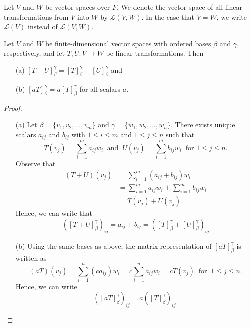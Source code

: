 \begin{definition}
    Let \( V  \) and \( W  \) be vector spaces over \( F  \). We denote the vector space of all linear transformations from \( V  \) into \( W   \) by \( \mathcal{L}(V,W)  \). In the case that \( V = W  \), we write \( \mathcal{L}(V)  \) instead of \( \mathcal{L}(V,W) \). 
\end{definition}

\begin{theorem}
   Let \( V  \) and \( W \) be finite-dimensional vector spaces with ordered bases \( \beta  \) and \( \gamma \), respectively, and let \( T,U : V \to W  \) be linear transformations. Then 
   \begin{enumerate}
       \item[(a)] \( [T+U]_{\beta}^{\gamma}  = [T]_{\beta}^{\gamma} + [U]_{\beta}^{\gamma}  \) and
        \item[(b)]\( [aT]_{\beta}^{\gamma}  = a [T]_{\beta}^{\gamma}  \) for all scalars \( a  \).
   \end{enumerate}
\end{theorem}
\begin{proof}
    \begin{enumerate}
        \item[(a)] 
    Let \( \beta = \{ {v}_{1}, {v}_{2}, \dots, {v}_{m} \}  \) and \( \gamma = \{ {w}_{1}, {w}_{2}, \dots, {w}_{n} \}  \). There exists unique scalars \( {a}_{ij}  \) and \( {b}_{ij}  \) with \( 1 \leq i \leq m  \) and \( 1 \leq j \leq n  \) such that
    \[  T({v}_{j}) = \sum_{ i=1 }^{ m } {a}_{ij} {w}_{i} \ \text{ and } \ U({v}_{j}) = \sum_{ i=1 }^{ m } {b}_{ij} {w}_{i} \ \text{ for } 1 \leq j \leq n.   \]
    Observe that 
    \begin{align*}
        (T + U)({v}_{j}) &= \sum_{ i=1 }^{ m } ({a}_{ij} + {b}_{ij}) {w}_{i} \\
        &= \sum_{ i=1 }^{ m } {a}_{ij} {w}_{i} + \sum_{ i=1 }^{ m } {b}_{ij} {w}_{i} \\
        &= T({v}_{j}) + U({v}_{j}).
    \end{align*}
    Hence, we can write that 
    \[ {([T+U]_{\beta}^{\gamma} )}_{ij} = {a}_{ij} + {b}_{ij} = {([T]_{\beta}^{\gamma} + [U]_{\beta}^{\gamma} )}_{ij}   \]

\item[(b)] Using the same bases as above, the matrix representation of \( [aT]_{\beta}^{\gamma}  \) is written as 
    \[  (aT)({v}_{j}) = \sum_{ i=1 }^{ n } ({ca}_{ij}) {w}_{i} = c \sum_{ i=1 }^{ n } {a}_{ij} {w}_{i} = cT({v}_{j}) \ \text{ for } \ 1 \leq j \leq n. \]
    Hence, we can write
    \[  ({[aT]_{\beta}^{\gamma} })_{ij} = a {([T]_{\beta}^{\gamma} )}_{ij}. \]
    \end{enumerate}
\end{proof}

